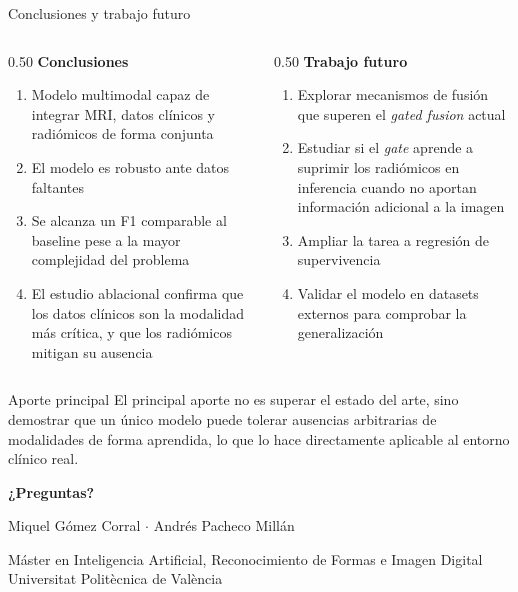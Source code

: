 \documentclass[aspectratio=169]{beamer}
\begin{document}
\begin{frame}{Conclusiones y trabajo futuro}
  \begin{columns}[T]
    \begin{column}{0.50\textwidth}
      \textbf{Conclusiones}
      \begin{enumerate}
        \item Modelo multimodal capaz de integrar MRI, datos clínicos y radiómicos de forma conjunta
        \item El modelo es robusto ante datos faltantes
        \item Se alcanza un F1 comparable al baseline pese a la mayor complejidad del problema
        \item El estudio ablacional confirma que los datos clínicos son la modalidad más crítica, y que los radiómicos mitigan su ausencia
      \end{enumerate}
    \end{column}

    \begin{column}{0.50\textwidth}
      \textbf{Trabajo futuro}
      \begin{enumerate}
        \item Explorar mecanismos de fusión que superen el \textit{gated fusion} actual
        \item Estudiar si el \textit{gate} aprende a suprimir los radiómicos en inferencia cuando no aportan información adicional a la imagen
        \item Ampliar la tarea a regresión de supervivencia
        \item Validar el modelo en datasets externos para comprobar la generalización
      \end{enumerate}
    \end{column}
  \end{columns}

  \vspace{0.3cm}

  \begin{block}{Aporte principal}
      \footnotesize
    El principal aporte no es superar el estado del arte, sino demostrar que un único modelo puede tolerar ausencias arbitrarias de modalidades de forma aprendida, lo que lo hace directamente aplicable al entorno clínico real.
  \end{block}

\end{frame}

\begin{frame}[plain]
  \centering
  \vspace{1.5cm}
  {\Huge\bfseries\color{darkgray}¿Preguntas?}

  \vspace{1.5cm}
  {\large Miquel Gómez Corral \quad $\cdot$ \quad Andrés Pacheco Millán}

  \vspace{0.4cm}
  {\small Máster en Inteligencia Artificial, Reconocimiento de Formas e Imagen Digital\\
  Universitat Politècnica de València}
\end{frame}
\end{document}
